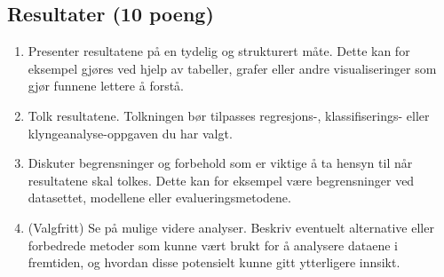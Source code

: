 \subsection{Resultater (10 poeng)}\label{resultater-10-poeng}

\begin{enumerate}
\def\labelenumi{\arabic{enumi}.}
\item
  Presenter resultatene på en tydelig og strukturert måte. Dette kan for
  eksempel gjøres ved hjelp av tabeller, grafer eller andre
  visualiseringer som gjør funnene lettere å forstå.
\item
  Tolk resultatene. Tolkningen bør tilpasses regresjons-,
  klassifiserings- eller klyngeanalyse-oppgaven du har valgt.
\item
  Diskuter begrensninger og forbehold som er viktige å ta hensyn til når
  resultatene skal tolkes. Dette kan for eksempel være begrensninger ved
  datasettet, modellene eller evalueringsmetodene.
\item
  (Valgfritt) Se på mulige videre analyser. Beskriv eventuelt
  alternative eller forbedrede metoder som kunne vært brukt for å
  analysere dataene i fremtiden, og hvordan disse potensielt kunne gitt
  ytterligere innsikt.
\end{enumerate}
